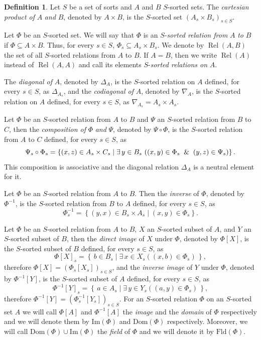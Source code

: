 \documentclass[a4paper, reqno
]{amsart}
\DeclareMathOperator{\Rel}{Rel}
\newcommand{\Dom}{\mathrm{Dom}}
\theoremstyle{plain}
\theoremstyle{definition}
\newtheorem{definition}[theorem]{Definition}
\begin{document}
\begin{definition}\label{DSortedMapping}
Let $S$ be a set of sorts and $A$ and $B$ $S$-sorted sets.
The \emph{cartesian product of} $A$ \emph{and} $B$, denoted by $A\times B$, is the $S$-sorted set $\left(A_{s}\times B_{s}\right)_{s\in S}.$

Let $\Phi$ be an $S$-sorted set.
We will say that $\Phi$ is an $S$-\emph{sorted relation from} $A$ \emph{to} $B$ if $\Phi\subseteq A\times B$.
Thus, for every $s\in S$, $\Phi_{s}\subseteq A_{s}\times B_{s}$.
We denote by $\Rel(A,B)$ the set of all $S$-sorted relations from $A$ to $B$.
If $A=B$, then we write $\Rel(A)$ instead of $\Rel(A,A)$ and call its elements $S$-\emph{sorted relations on} $A$.

The \emph{diagonal of} $A$, denoted by $\Delta_{A}$, is the $S$-sorted relation on $A$ defined, for every $s\in S$, as $\Delta_{A_{s}}$, and the \emph{codiagonal of} $A$, denoted by $\nabla_{A}$, is the $S$-sorted relation on $A$ defined, for every $s\in S$, as $\nabla_{A_{s}} = A_{s}\times A_{s}$.

Let $\Phi$ be an $S$-sorted relation from $A$ to $B$ and $\Psi$ an $S$-sorted relation from $B$ to $C$, then the \emph{composition of} $\Phi$ \emph{and} $\Psi$, denoted by $\Psi\circ\Phi$, is the $S$-sorted relation from $A$ to $C$ defined, for every $s\in S$, as
$$
\Psi_{s}\circ\Phi_{s}
=\left\lbrace
(x,z)\in A_{s}\times C_{s}
\mid \exists\,y\in B_{s}\,
\left(
(x,y)\in \Phi_{s}\And (y,z)\in \Psi_{s}
\right)
\right\rbrace.
$$
This composition is associative and the diagonal relation $\Delta_{A}$ is a neutral element for it.

Let $\Phi$ be an $S$-sorted relation from $A$ to $B$.
Then the \emph{inverse} of $\Phi$, denoted by $\Phi^{-1}$, is the $S$-sorted relation from $B$ to $A$ defined, for every $s\in S$, as
$$
\Phi_{s}^{-1}
=\left\lbrace(y,x)\in B_{s}\times A_{s}\mid (x,y)\in \Phi_{s}
\right\rbrace.
$$

Let $\Phi$ be an $S$-sorted relation from $A$ to $B$, $X$ an $S$-sorted subset of $A$, and $Y$ an $S$-sorted subset of $B$, then the \emph{direct image} of $X$ under $\Phi$, denoted by $\Phi[X]$, is the $S$-sorted subset of $B$ defined, for every $s\in S$, as
$$
\Phi[X]_{s} =\left\lbrace\,b\in B_{s}\mid \exists\, x\in X_{s}((x,b)\in \Phi_{s})\,\right\rbrace,
$$
therefore $\Phi[X] = (\Phi_{s}[X_{s}])_{s\in S}$, and the \emph{inverse image} of $Y$ under $\Phi$, denoted by $\Phi^{-1}[Y]$, is the $S$-sorted subset of $A$ defined, for every $s\in S$, as
$$
\Phi^{-1}[Y]_{s} =\left\lbrace\,a\in A_{s}\mid \exists\, y\in Y_{s}((a,y)\in \Phi_{s})\,\right\rbrace,
$$
therefore $\Phi^{-1}[Y] = (\Phi^{-1}_{s}[Y_{s}])_{s\in S}$.
For an $S$-sorted relation $\Phi$ on an $S$-sorted set $A$ we will call $\Phi[A]$ and $\Phi^{-1}[A]$ the \emph{image} and the \emph{domain} of $\Phi$ respectively and we will denote them by $\mathrm{Im}(\Phi)$ and $\Dom(\Phi)$ respectively.
Moreover, we will call $\Dom(\Phi)\cup\mathrm{Im}(\Phi)$ the \emph{field} of $\Phi$ and we will denote it by $\mathrm{Fld}(\Phi)$.


\end{definition}
\end{document}
